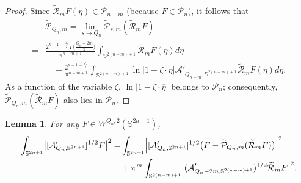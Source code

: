 \documentclass[12pt,reqno]{amsart}%
\theoremstyle{plain}
\newtheorem{lemma}{Lemma}[section]
\numberwithin{equation}{section}
\begin{document}
\begin{proof}
Since \(\widetilde{\mathcal{R}}_{m}F(\eta) \in \mathcal{P}_{n-m}\) (because \(F \in \mathcal{P}_n\)), it follows that
\begin{align*}
&\widetilde{\mathcal{P}}_{Q_n,m}
= \lim_{s\rightarrow Q_n}\widetilde{\mathcal{P}}_{s,m}(\widetilde{\mathcal{R}}_{m}F) \\
=& \frac{2^{n-1-\frac{Q_n}{2}}\Gamma\bigl(\frac{Q_n-2m}{2}\bigr)}
{\pi^{n-m+1}} \int_{\mathbb{S}^{2(n-m)+1}} \widetilde{\mathcal{R}}_{m}F(\eta)d\eta \\
&\quad - \frac{2^{n+1-\frac{Q_n}{2}}}{\pi^{n-m+1}}
\int_{\mathbb{S}^{2(n-m)+1}} \ln|1-\zeta\cdot\overline{\eta}|
\mathcal{A}'_{Q_{n-m},\mathbb{S}^{2(n-m)+1}}\widetilde{\mathcal{R}}_{m}F(\eta)d\eta .
\end{align*}
As a function of the variable \(\zeta\), \(\ln|1-\zeta\cdot\overline{\eta}|\) belongs to \(\mathcal{P}_n\); consequently,
\(\widetilde{\mathcal{P}}_{Q_n,m}(\widetilde{\mathcal{R}}_{m}F)\) also lies in \(\mathcal{P}_n\).
\end{proof}

\begin{lemma}\label{lm4.5}
For any \(F \in W^{Q_n,2}(\mathbb{S}^{2n+1})\),
\begin{align}
\int_{\mathbb{S}^{2n+1}}\bigl|[\mathcal{A}'_{Q_n,\mathbb{S}^{2n+1}}]^{1/2}F\bigr|^{2}
=& \int_{\mathbb{S}^{2n+1}}\Bigl|[\mathcal{A}'_{Q_n,\mathbb{S}^{2n+1}}]^{1/2}\bigl(F-
\widetilde{\mathcal{P}}_{Q_n,m}(\widetilde{\mathcal{R}}_{m}F)\bigr)\Bigr|^{2} \nonumber\\
& + \pi^{m}\int_{\mathbb{S}^{2(n-m)+1}}
\bigl|(\mathcal{A}'_{Q_n-2m,\mathbb{S}^{2(n-m)+1}})^{1/2}\widetilde{\mathcal{R}}_{m}F\bigr|^{2}. \label{4.5}
\end{align}
\end{lemma}
\end{document}
